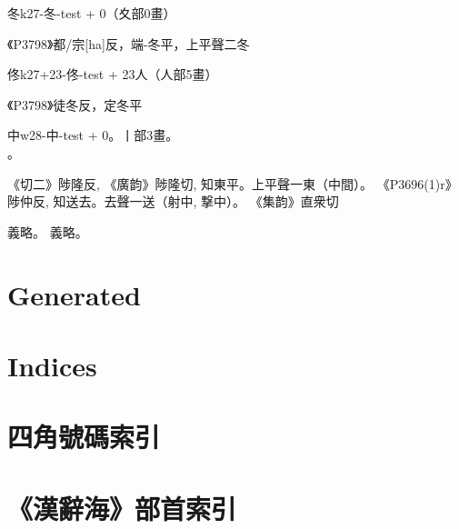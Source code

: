 \documentclass[a5paper,10pt,twoside]{article}
\begin{document}

\begin{Entry}{冬}{{k}}{27-冬-test}
  + 0（夊部0畫）
  \\
  \begin{Sound}
    《P3798》都/宗[ha]反，端-冬平，上平聲二冬
  \end{Sound}
\end{Entry}

\begin{Entry}{佟}{{k}}{27+23-佟-test}
  + 23人（人部5畫）
  \\
  \begin{Sound}
    《P3798》徒冬反，定冬平
  \end{Sound}
\end{Entry}


\begin{Entry}{中}{{w}}{28-中-test}%
  + 0。丨部3畫。
  \\
  。
  \begin{Sound}
    《切二》陟隆反, 《廣韵》陟隆切, 知東平。上平聲一東（中間）。
    《P3696(1)r》陟仲反, 知送去。去聲一送（射中, 撃中）。
    《集韵》直衆切
  \end{Sound}
  \begin{Sense}
    義略。
    義略。
  \end{Sense}
\end{Entry}

\cleardoublepage{}
\part{Generated}

\RestorePageLayout

\part{Indices}
\part{四角號碼索引}\label{part:四角號碼索引}

\part{《漢辭海》部首索引}

\end{document}
